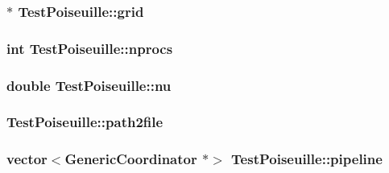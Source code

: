 \subsubsection[{grid}]{$\ast$ Test\+Poiseuille\+::grid\hspace{0.3cm}{\ttfamily [protected]}}\label{class_test_poiseuille_a6386bbb4b0e5cf8e57a1c6927f2571bc}
\hypertarget{class_test_poiseuille_a95d28f5f8a1c178eb4a497a61cbf589b}{}
\subsubsection[{nprocs}]{\setlength{\rightskip}{0pt plus 5cm}int Test\+Poiseuille\+::nprocs\hspace{0.3cm}{\ttfamily [protected]}}\label{class_test_poiseuille_a95d28f5f8a1c178eb4a497a61cbf589b}
\hypertarget{class_test_poiseuille_a9eba2815d196e8a68f1e55ccc1f49587}{}
\subsubsection[{nu}]{\setlength{\rightskip}{0pt plus 5cm}double Test\+Poiseuille\+::nu\hspace{0.3cm}{\ttfamily [protected]}}\label{class_test_poiseuille_a9eba2815d196e8a68f1e55ccc1f49587}
\hypertarget{class_test_poiseuille_a99086da8432f1ae5eb24d9647eef4c74}{}
\subsubsection[{path2file}]{ Test\+Poiseuille\+::path2file\hspace{0.3cm}{\ttfamily [protected]}}\label{class_test_poiseuille_a99086da8432f1ae5eb24d9647eef4c74}
\hypertarget{class_test_poiseuille_a4b10cfd21bf7e02533562baf700e6497}{}
\subsubsection[{pipeline}]{\setlength{\rightskip}{0pt plus 5cm}vector$<${\bf Generic\+Coordinator} $\ast$$>$ Test\+Poiseuille\+::pipeline\hspace{0.3cm}{\ttfamily [protected]}}\label{class_test_poiseuille_a4b10cfd21bf7e02533562baf700e6497}
\hypertarget{class_test_poiseuille_a5d589cfd40e004bf1d43a774c6b4c872}{}
